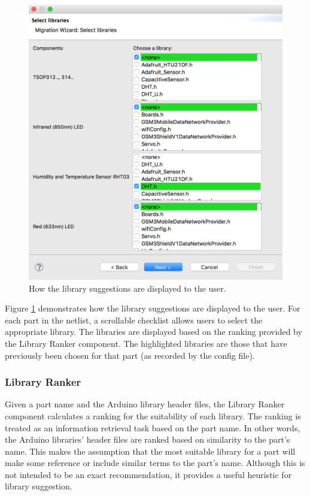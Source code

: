 \documentclass{UoYCSproject}
\begin{document}
\begin{figure}[h!]
  \centering
  \includegraphics[width=0.8\linewidth]{graphics/lib_selection_ui.png}
  \caption{How the library suggestions are displayed to the user.}
  \label{fig:lib_selection_ui}
\end{figure}

Figure \ref{fig:lib_selection_ui} demonstrates how the library suggestions are displayed to the user. For each part in the netlist, a scrollable checklist allows users to select the appropriate library. The libraries are displayed based on the ranking provided by the Library Ranker component. The highlighted libraries are those that have previously been chosen for that part (as recorded by the config file).

\subsubsection{Library Ranker} \label{lib_ranker}
Given a part name and the Arduino library header files, the Library Ranker component calculates a ranking for the suitability of each library. The ranking is treated as an information retrieval task based on the part name. In other words, the Arduino libraries' header files are ranked based on similarity to the part's name. This makes the assumption that the most suitable library for a part will make some reference or include similar terms to the part's name. Although this is not intended to be an exact recommendation, it provides a useful heuristic for library suggestion.
\end{document}

